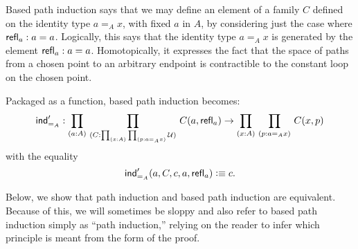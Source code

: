 
Based path induction says that we may define an element of a family $C$ defined on the identity type $a =_A x$, with fixed $a$ in $A$, by considering just the case where $\mathsf{refl}_{a} : a = a$.  Logically, this says that the identity type $a =_A x$ is generated by the element  $\mathsf{refl}_{a} : a = a$.  Homotopically, it expresses the fact  that the space of paths from a chosen point to an arbitrary endpoint is contractible to the constant loop on the chosen point.

Packaged as a function, based path induction becomes:
\begin{align*}
  \indid{A}' :  \dprd{a:A}{C : \prd{x:A}{p : a =_A x} \UU}
  C(a,\refl{a}) \to \dprd{x:A}{p : a =_A x} C(x,p) 
\end{align*}
with the equality
\[ \mathsf{ind}_{=_{A}}'(a,C,c,a,\mathsf{refl}_{a}) \vcentcolon\equiv c. \]

Below, we show that path induction and based path induction are equivalent.  Because of this, we will sometimes be sloppy and also refer to based path induction simply as ``path induction,'' relying on the reader to infer which principle is meant from the form of the proof.  

%
%

